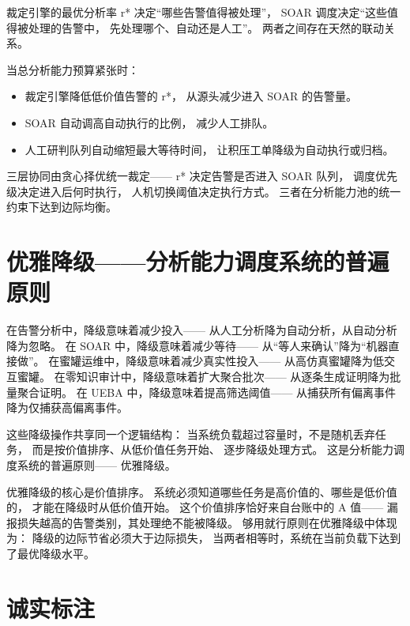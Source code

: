 \documentclass[11pt,a4paper]{article}
\begin{document}
裁定引擎的最优分析率 r* 决定“哪些告警值得被处理”，
SOAR 调度决定“这些值得被处理的告警中，
先处理哪个、自动还是人工”。
两者之间存在天然的联动关系。

当总分析能力预算紧张时：
\begin{itemize}
    \item 裁定引擎降低低价值告警的 r*，
          从源头减少进入 SOAR 的告警量。
    \item SOAR 自动调高自动执行的比例，
          减少人工排队。
    \item 人工研判队列自动缩短最大等待时间，
          让积压工单降级为自动执行或归档。
\end{itemize}

三层协同由贪心择优统一裁定——
r* 决定告警是否进入 SOAR 队列，
调度优先级决定进入后何时执行，
人机切换阈值决定执行方式。
三者在分析能力池的统一约束下达到边际均衡。

\section{优雅降级——分析能力调度系统的普遍原则}

在告警分析中，降级意味着减少投入——
从人工分析降为自动分析，从自动分析降为忽略。
在 SOAR 中，降级意味着减少等待——
从“等人来确认”降为“机器直接做”。
在蜜罐运维中，降级意味着减少真实性投入——
从高仿真蜜罐降为低交互蜜罐。
在零知识审计中，降级意味着扩大聚合批次——
从逐条生成证明降为批量聚合证明。
在 UEBA 中，降级意味着提高筛选阈值——
从捕获所有偏离事件降为仅捕获高偏离事件。

这些降级操作共享同一个逻辑结构：
当系统负载超过容量时，不是随机丢弃任务，
而是按价值排序、从低价值任务开始、
逐步降级处理方式。
这是分析能力调度系统的普遍原则——
优雅降级。

优雅降级的核心是价值排序。
系统必须知道哪些任务是高价值的、哪些是低价值的，
才能在降级时从低价值开始。
这个价值排序恰好来自台账中的 A 值——
漏报损失越高的告警类别，其处理绝不能被降级。
够用就行原则在优雅降级中体现为：
降级的边际节省必须大于边际损失，
当两者相等时，系统在当前负载下达到了最优降级水平。

\section{诚实标注}
\end{document}
